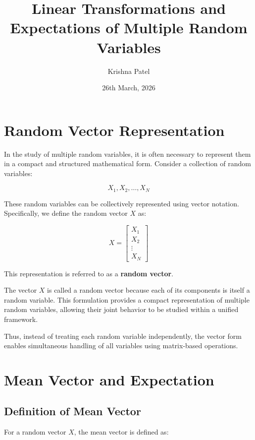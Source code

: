 \documentclass{article}
\begin{document}
\title{Linear Transformations and Expectations of Multiple Random Variables}
\author{Krishna Patel}
\date{26th March, 2026}

\maketitle





\section{Random Vector Representation}

In the study of multiple random variables, it is often necessary to represent them in a compact and structured mathematical form. Consider a collection of random variables:

\[
X_1, X_2, \dots, X_N
\]

These random variables can be collectively represented using vector notation. Specifically, we define the random vector $X$ as:

\[
X =
\begin{bmatrix}
X_1 \\
X_2 \\
\vdots \\
X_N
\end{bmatrix}
\]

This representation is referred to as a \textbf{random vector}.

The vector $X$ is called a random vector because each of its components is itself a random variable. This formulation provides a compact representation of multiple random variables, allowing their joint behavior to be studied within a unified framework.

Thus, instead of treating each random variable independently, the vector form enables simultaneous handling of all variables using matrix-based operations.

\section{Mean Vector and Expectation}

\subsection{Definition of Mean Vector}

For a random vector $X$, the mean vector is defined as:
\end{document}
